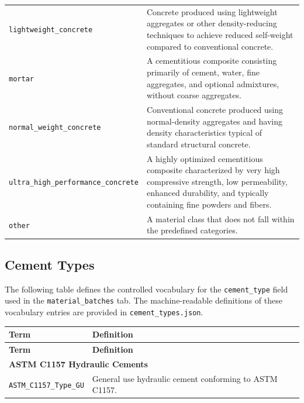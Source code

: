 \documentclass[11pt]{book}
\begin{document}
{\begin{longtable}{p{}p{}}
\texttt{lightweight\_concrete} &
Concrete produced using lightweight aggregates or other density-reducing techniques to achieve reduced self-weight compared to conventional concrete. \\

\texttt{mortar} &
A cementitious composite consisting primarily of cement, water, fine aggregates, and optional admixtures, without coarse aggregates. \\

\texttt{normal\_weight\_concrete} &
Conventional concrete produced using normal-density aggregates and having density characteristics typical of standard structural concrete. \\

\texttt{ultra\_high\_performance\_concrete} &
A highly optimized cementitious composite characterized by very high compressive strength, low permeability, enhanced durability, and typically containing fine powders and fibers. \\

\texttt{other} &
A material class that does not fall within the predefined categories. \\

\hline
\end{longtable}


%
\subsection{Cement Types}
\label{vocab:cement_type_list}

The following table defines the controlled vocabulary for the \texttt{cement\_type} field used in the \texttt{material\_batches} tab. The machine-readable definitions of these vocabulary entries are provided in \texttt{cement\_types.json}.

\begin{longtable}{p{}p{}}
\label{tab:cement_types_vocab}\\
\hline
\textbf{Term} & \textbf{Definition} \\
\hline
\endfirsthead

\hline
\textbf{Term} & \textbf{Definition} \\
\hline
\endhead

\multicolumn{2}{l}{\textbf{ASTM C1157 Hydraulic Cements}}\\
\hline

\texttt{ASTM\_C1157\_Type\_GU} &
General use hydraulic cement conforming to ASTM C1157. \\


\end{longtable}}
\end{document}
